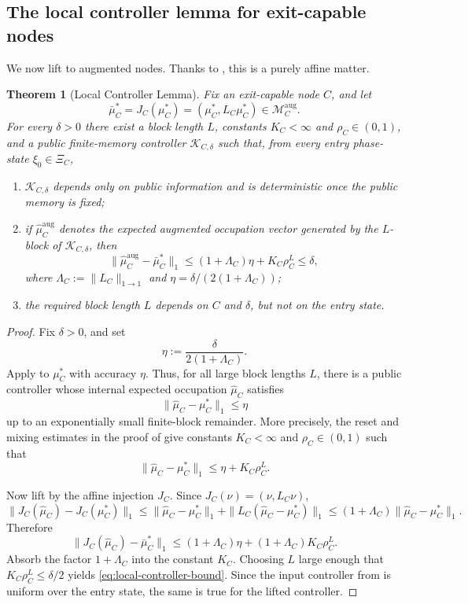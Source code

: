 \documentclass[12pt]{article}
\newtheorem{theorem}{Theorem}[section]
\theoremstyle{definition}
\newcommand{\1}{\mathbf{1}}
\newcommand{\cK}{\mathcal{K}}
\newcommand{\cM}{\mathcal{M}}
\begin{document}
\subsection{The local controller lemma for exit-capable nodes}
\label{subsec:local-controller}

We now lift  to augmented nodes.  Thanks to
, this is a purely affine matter.

\begin{theorem}[Local Controller Lemma]
\label{thm:local-controller}
Fix an exit-capable node \(C\), and let
\[
\bar\mu_C^{*}=J_C(\mu_C^{*})=(\mu_C^{*},L_C\mu_C^{*})\in \cM_C^{\mathrm{aug}}.
\]
For every \(\delta>0\) there exist a block length \(L\), constants \(K_C<\infty\) and
\(\rho_C\in(0,1)\), and a public finite-memory controller \(\cK_{C,\delta}\) such that,
from every entry phase-state \(\xi_0\in \Xi_C\),
\begin{enumerate}[label=\textnormal{(\roman*)},leftmargin=2.6em]
\item \(\cK_{C,\delta}\) depends only on public information and is deterministic once the
public memory is fixed;
\item if \(\widehat\mu_C^{\mathrm{aug}}\) denotes the expected augmented occupation vector
generated by the \(L\)-block of \(\cK_{C,\delta}\), then
\begin{equation}
\label{eq:local-controller-bound}
\bigl\|\widehat\mu_C^{\mathrm{aug}}-\bar\mu_C^{*}\bigr\|_1
\le
(1+\Lambda_C)\eta + K_C\rho_C^L
\le \delta,
\end{equation}
where \(\Lambda_C:=\|L_C\|_{1\to 1}\) and \(\eta=\delta/(2(1+\Lambda_C))\);
\item the required block length \(L\) depends on \(C\) and \(\delta\), but not on the
entry state.
\end{enumerate}
\end{theorem}

\begin{proof}
Fix \(\delta>0\), and set
\[
\eta:=\frac{\delta}{2(1+\Lambda_C)}.
\]
Apply  to \(\mu_C^{*}\) with accuracy \(\eta\).  Thus, for all large block
lengths \(L\), there is a public controller whose internal expected occupation
\(\widehat\mu_C\) satisfies
\[
\|\widehat\mu_C-\mu_C^{*}\|_1\le \eta
\]
up to an exponentially small finite-block remainder.  More precisely, the reset and
mixing estimates in the proof of  give constants \(K_C<\infty\) and
\(\rho_C\in(0,1)\) such that
\[
\|\widehat\mu_C-\mu_C^{*}\|_1\le \eta + K_C\rho_C^L.
\]

Now lift by the affine injection \(J_C\).  Since \(J_C(\nu)=(\nu,L_C\nu)\),
\[
\|J_C(\widehat\mu_C)-J_C(\mu_C^{*})\|_1
\le
\|\widehat\mu_C-\mu_C^{*}\|_1
+
\|L_C(\widehat\mu_C-\mu_C^{*})\|_1
\le
(1+\Lambda_C)\|\widehat\mu_C-\mu_C^{*}\|_1.
\]
Therefore
\[
\|J_C(\widehat\mu_C)-\bar\mu_C^{*}\|_1
\le
(1+\Lambda_C)\eta + (1+\Lambda_C)K_C\rho_C^L.
\]
Absorb the factor \(1+\Lambda_C\) into the constant \(K_C\).  Choosing \(L\) large enough
that \(K_C\rho_C^L\le \delta/2\) yields \eqref{eq:local-controller-bound}.  Since the
input controller from  is uniform over the entry state, the same is true
for the lifted controller.
\end{proof}
\end{document}
